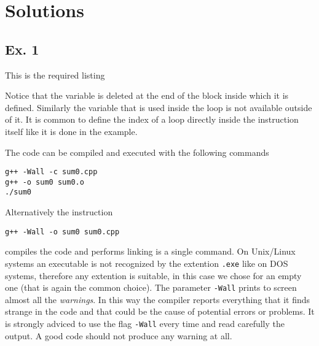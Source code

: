 \newpage

\section*{Solutions}

\subsection*{Ex. 1}
This is the required listing
%
\lstset{basicstyle=\scriptsize\sf}

\lstset{basicstyle=\sf}
%
Notice that the variable  is deleted at the end of the  block
inside which it is defined. Similarly the variable  that is used inside
the  loop is not available outside of it. It is common to define the
index of a  loop directly inside the instruction itself like it is done
in the example.

The code can be compiled and executed with the following commands
\begin{verbatim}
g++ -Wall -c sum0.cpp
g++ -o sum0 sum0.o
./sum0
\end{verbatim}
Alternatively the instruction
\begin{verbatim}
g++ -Wall -o sum0 sum0.cpp
\end{verbatim}
compiles the code and performs linking is a single command.
On Unix/Linux systems an executable is not recognized by the extention
\texttt{.exe} like on DOS systems, therefore any extention is suitable, in this
case we chose for an empty one (that is again the common choice).
The parameter \texttt{-Wall} prints to screen almost all the \emph{warnings}.
In this way the compiler reports everything that it finds strange in the code
and that could be the cause of potential errors or problems. It is strongly
adviced to use the flag \texttt{-Wall} every time and read carefully the output.
A good code should not produce any warning at all.

